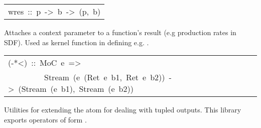 \begin{haddockdesc}
\item[\begin{tabular}{@{}l}
wres\ ::\ p\ ->\ b\ ->\ (p,\ b)
\end{tabular}]\haddockbegindoc
Attaches a context parameter to a function's result (e.g
 production rates in SDF). Used as kernel function in defining
 e.g. .\par


\item[\begin{tabular}{@{}l}
(-*<)\ ::\ MoC\ e\ =>\\\ \ \ \ \ \ \ \ \ Stream\ (e\ (Ret\ e\ b1,\ Ret\ e\ b2))\ ->\ (Stream\ (e\ b1),\ Stream\ (e\ b2))
\end{tabular}]\haddockbegindoc
Utilities for extending the \haddockid{-*} atom for dealing with tupled
 outputs. This library exports operators of form .\par

\end{haddockdesc}